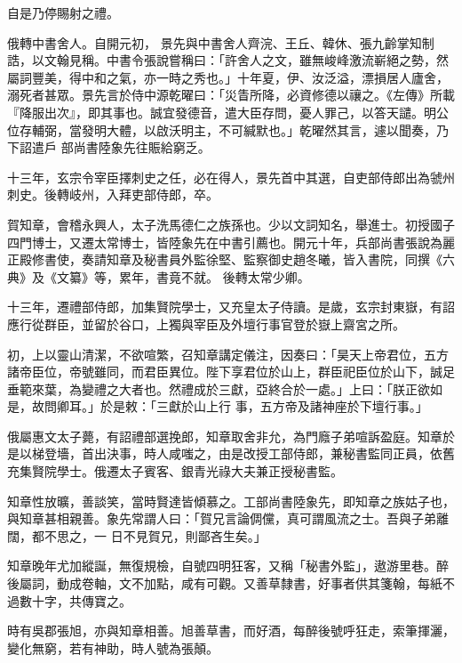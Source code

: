 \begin{pinyinscope}
 自是乃停賜射之禮。



 俄轉中書舍人。自開元初，
 景先與中書舍人齊浣、王丘、韓休、張九齡掌知制誥，以文翰見稱。中書令張說嘗稱曰：「許舍人之文，雖無峻峰激流嶄絕之勢，然屬詞豐美，得中和之氣，亦一時之秀也。」十年夏，伊、汝泛溢，漂損居人廬舍，溺死者甚眾。景先言於侍中源乾曜曰：「災眚所降，必資修德以禳之。《左傳》所載『降服出次』，即其事也。誠宜發德音，遣大臣存問，憂人罪己，以答天譴。明公位存輔弼，當發明大體，以啟沃明主，不可緘默也。」乾曜然其言，遽以聞奏，乃下詔遣戶
 部尚書陸象先往賑給窮乏。



 十三年，玄宗令宰臣擇刺史之任，必在得人，景先首中其選，自吏部侍郎出為虢州刺史。後轉岐州，入拜吏部侍郎，卒。



 賀知章，會稽永興人，太子洗馬德仁之族孫也。少以文詞知名，舉進士。初授國子四門博士，又遷太常博士，皆陸象先在中書引薦也。開元十年，兵部尚書張說為麗正殿修書使，奏請知章及秘書員外監徐堅、監察御史趙冬曦，皆入書院，同撰《六典》及《文纂》等，累年，書竟不就。
 後轉太常少卿。



 十三年，遷禮部侍郎，加集賢院學士，又充皇太子侍讀。是歲，玄宗封東嶽，有詔應行從群臣，並留於谷口，上獨與宰臣及外壇行事官登於嶽上齋宮之所。



 初，上以靈山清潔，不欲喧繁，召知章講定儀注，因奏曰：「昊天上帝君位，五方諸帝臣位，帝號雖同，而君臣異位。陛下享君位於山上，群臣祀臣位於山下，誠足垂範來葉，為變禮之大者也。然禮成於三獻，亞終合於一處。」上曰：「朕正欲如是，故問卿耳。」於是敕：「三獻於山上行
 事，五方帝及諸神座於下壇行事。」



 俄屬惠文太子薨，有詔禮部選挽郎，知章取舍非允，為門廕子弟喧訴盈庭。知章於是以梯登墻，首出決事，時人咸嗤之，由是改授工部侍郎，兼秘書監同正員，依舊充集賢院學士。俄遷太子賓客、銀青光祿大夫兼正授秘書監。



 知章性放曠，善談笑，當時賢達皆傾慕之。工部尚書陸象先，即知章之族姑子也，與知章甚相親善。象先常謂人曰：「賀兄言論倜儻，真可謂風流之士。吾與子弟離闊，都不思之，一
 日不見賀兄，則鄙吝生矣。」



 知章晚年尤加縱誕，無復規檢，自號四明狂客，又稱「秘書外監」，遨游里巷。醉後屬詞，動成卷軸，文不加點，咸有可觀。又善草隸書，好事者供其箋翰，每紙不過數十字，共傳寶之。



 時有吳郡張旭，亦與知章相善。旭善草書，而好酒，每醉後號呼狂走，索筆揮灑，變化無窮，若有神助，時人號為張顛。




\end{pinyinscope}
